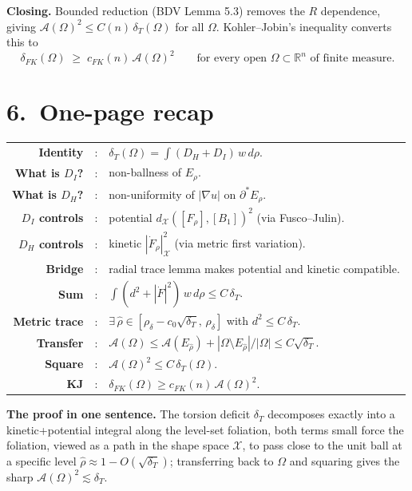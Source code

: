\documentclass[11pt,a4paper]{article}
\newcommand{\R}{\mathbb{R}}
\newcommand{\X}{\mathcal{X}}
\newcommand{\Erho}{E_\rho}
\newcommand{\Frho}{F_\rho}
\newcommand{\rhad}{\widehat{\rho}}
\newcommand{\rhodelta}{\rho_\delta}
\newcommand{\Fr}{\mathcal{A}}
\newcommand{\deltaT}{\delta_T}
\newcommand{\deltaFK}{\delta_{FK}}
\newcommand{\dX}{d_{\X}}
\begin{document}
\textbf{Closing.} Bounded reduction (BDV Lemma 5.3) removes the $R$ dependence, giving $\Fr(\Omega)^2 \le C(n)\,\deltaT(\Omega)$ for all $\Omega$. Kohler--Jobin's inequality converts this to
\[
\boxed{\deltaFK(\Omega) \;\ge\; c_{FK}(n)\,\Fr(\Omega)^2 \qquad \text{for every open $\Omega \subset \R^n$ of finite measure.}}
\]

\section*{6.\ One-page recap}

\begin{center}
\renewcommand{\arraystretch}{1.15}
\begin{tabular}{rcl}
\textbf{Identity} & : & $\deltaT(\Omega) = \int (D_H + D_I)\, w\, d\rho$.\\[2pt]
\textbf{What is $D_I$?} & : & non-ballness of $\Erho$.\\
\textbf{What is $D_H$?} & : & non-uniformity of $|\nabla u|$ on $\partial^*\Erho$.\\[6pt]
\textbf{$D_I$ controls} & : & potential $\dX([\Frho], [B_1])^2$ (via Fusco--Julin).\\
\textbf{$D_H$ controls} & : & kinetic $|\dot \Frho|_\X^2$ (via metric first variation).\\[6pt]
\textbf{Bridge} & : & radial trace lemma makes potential and kinetic compatible.\\[6pt]
\textbf{Sum} & : & $\int (d^2 + |\dot F|^2)\, w\, d\rho \le C\,\deltaT$.\\[2pt]
\textbf{Metric trace} & : & $\exists\, \rhad \in [\rhodelta - c_0\sqrt{\deltaT},\, \rhodelta]$ with $d^2 \le C\,\deltaT$.\\[2pt]
\textbf{Transfer} & : & $\Fr(\Omega) \le \Fr(E_{\rhad}) + |\Omega \setminus E_{\rhad}|/|\Omega| \le C\sqrt{\deltaT}$.\\[2pt]
\textbf{Square} & : & $\Fr(\Omega)^2 \le C\,\deltaT(\Omega)$.\\[2pt]
\textbf{KJ} & : & $\deltaFK(\Omega) \ge c_{FK}(n)\,\Fr(\Omega)^2$.\\
\end{tabular}
\end{center}

\bigskip

\textbf{The proof in one sentence.} The torsion deficit $\deltaT$ decomposes exactly into a kinetic+potential integral along the level-set foliation, both terms small force the foliation, viewed as a path in the shape space $\X$, to pass close to the unit ball at a specific level $\rhad \approx 1 - O(\sqrt{\deltaT})$; transferring back to $\Omega$ and squaring gives the sharp $\Fr(\Omega)^2 \lesssim \deltaT$.
\end{document}
